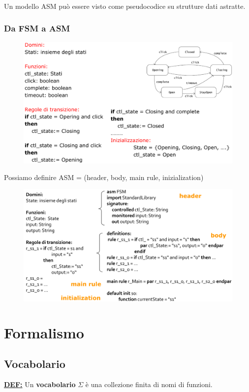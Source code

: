 \noindent Un modello ASM può essere visto come pseudocodice su strutture dati astratte.

\subsubsection{Da FSM a ASM}
\begin{figure}[H]
    \centering
    \includegraphics[width=0.92\linewidth]{chapters/1-asm/images/fsm-asm2.png}
\end{figure}

\noindent Possiamo definire ASM = (header, body, main rule, inizialization)

\begin{figure}[H]
    \centering
    \includegraphics[width=0.92\linewidth]{chapters/1-asm/images/comp-asm.png}
\end{figure}

\section{Formalismo}

\subsection{Vocabolario}
\underline{\textbf{DEF:}} Un \textbf{vocabolario} $\Sigma$ è una collezione finita di nomi di 
funzioni.

